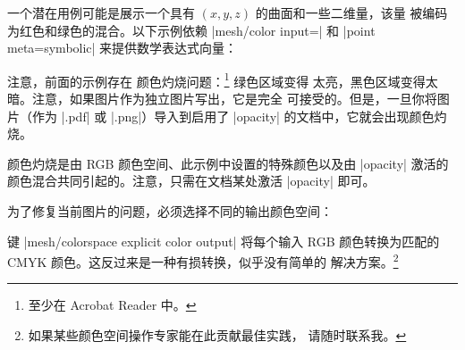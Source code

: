 {{一个潜在用例可能是展示一个具有 $(x,y,z)$ 的曲面和一些二维量，该量
被编码为红色和绿色的混合。以下示例依赖
|mesh/color input=| 和
|point meta=symbolic| 来提供数学表达式向量：
%
\pgfplotsexpensiveexample
\begin{codeexample}[]
\end{codeexample}
%
\noindent 注意，前面的示例存在
颜色灼烧问题：\footnote{至少在 Acrobat Reader 中。} 绿色区域变得
太亮，黑色区域变得太暗。注意，如果图片作为独立图片写出，它是完全
可接受的。但是，一旦你将图片（作为 |.pdf| 或 |.png|）导入到启用了
|opacity| 的文档中，它就会出现颜色灼烧。

颜色灼烧是由 RGB 颜色空间、此示例中设置的特殊颜色以及由 |opacity|
激活的颜色混合共同引起的。注意，只需在文档某处激活 |opacity|
即可。

为了修复当前图片的问题，必须选择不同的输出颜色空间：

\pgfplotsexpensiveexample
\begin{codeexample}[]
\end{codeexample}
%
\noindent 键 |mesh/colorspace explicit color output| 将每个输入 RGB
颜色转换为匹配的 CMYK 颜色。这反过来是一种有损转换，似乎没有简单的
解决方案。\footnote{如果某些颜色空间操作专家能在此贡献最佳实践，
请随时联系我。}

}}
